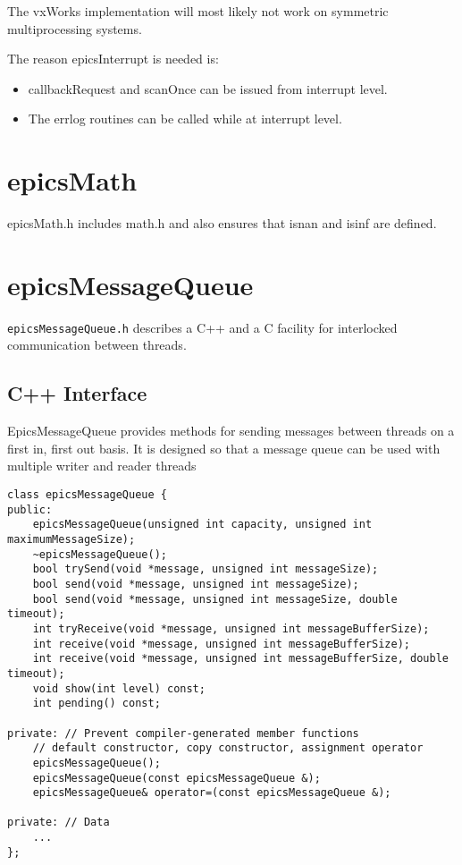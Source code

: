 The vxWorks implementation will most likely not work on symmetric multiprocessing systems.

The reason epicsInterrupt is needed is:

\begin{itemize}
\item callbackRequest and scanOnce can be issued from interrupt level.

\item The errlog routines can be called while at interrupt level.

\end{itemize}

\section{epicsMath}

epicsMath.h includes math.h and also ensures that isnan and isinf are defined.

\section{epicsMessageQueue}

\verb|epicsMessageQueue.h| describes a C++ and a C facility for interlocked communication between threads.

\subsection{C++ Interface}

EpicsMessageQueue provides methods for sending messages between threads on a first in, first out basis.  It is designed 
so that a message queue can be used with multiple writer and reader threads

\begin{verbatim}
class epicsMessageQueue {
public:
    epicsMessageQueue(unsigned int capacity, unsigned int maximumMessageSize);
    ~epicsMessageQueue();
    bool trySend(void *message, unsigned int messageSize);
    bool send(void *message, unsigned int messageSize);
    bool send(void *message, unsigned int messageSize, double timeout);
    int tryReceive(void *message, unsigned int messageBufferSize);
    int receive(void *message, unsigned int messageBufferSize);
    int receive(void *message, unsigned int messageBufferSize, double timeout);
    void show(int level) const;
    int pending() const;

private: // Prevent compiler-generated member functions
    // default constructor, copy constructor, assignment operator
    epicsMessageQueue();
    epicsMessageQueue(const epicsMessageQueue &);
    epicsMessageQueue& operator=(const epicsMessageQueue &);

private: // Data
    ...
};
\end{verbatim}

